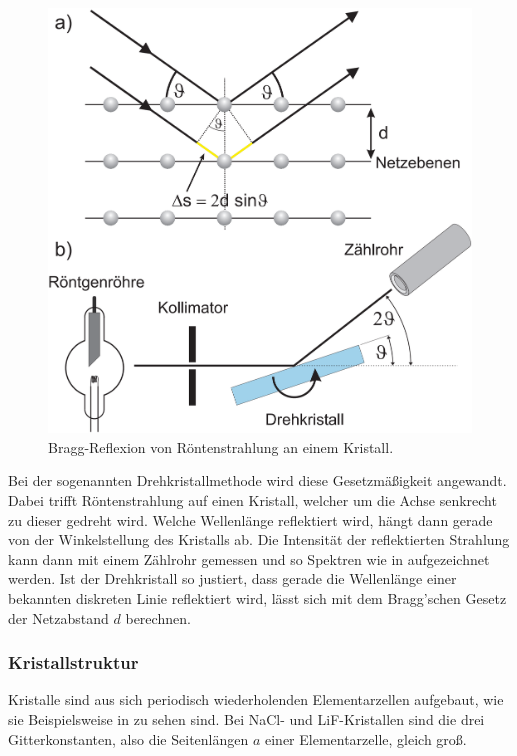 \begin{figure}[H]
  \centering
  \includegraphics[width=.9\textwidth,trim={2cm 14cm 0.5cm 0},clip]{files/bragg_reflexion_drehkristall.png}
  \caption{Bragg-Reflexion von Röntenstrahlung an einem Kristall.}
  \label{fig:bragg_reflexion_drehkristall_a}
\end{figure}

Bei der sogenannten Drehkristallmethode wird diese Gesetzmäßigkeit angewandt. Dabei trifft Röntenstrahlung auf einen Kristall, welcher um die Achse senkrecht zu dieser gedreht wird. Welche Wellenlänge reflektiert wird, hängt dann gerade von der Winkelstellung des Kristalls ab. Die Intensität der reflektierten Strahlung kann dann mit einem Zählrohr gemessen und so Spektren wie in  aufgezeichnet werden. Ist der Drehkristall so justiert, dass gerade die Wellenlänge einer bekannten diskreten Linie reflektiert wird, lässt sich mit dem Bragg'schen Gesetz der Netzabstand $d$ berechnen.

\subsubsection*{Kristallstruktur}

Kristalle sind aus sich periodisch wiederholenden Elementarzellen aufgebaut, wie sie Beispielsweise in  zu sehen sind. Bei NaCl- und LiF-Kristallen sind die drei Gitterkonstanten, also die Seitenlängen $a$ einer Elementarzelle, gleich groß.

